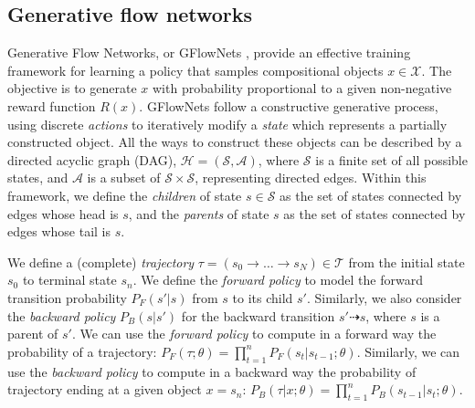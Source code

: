 \documentclass[twoside]{article}
\theoremstyle{plain}
\theoremstyle{definition}
\theoremstyle{remark}
\begin{document}
\subsection{Generative flow networks}
\label{sec:gfn}
Generative Flow Networks, or GFlowNets \citep{bengio2021flow,bengio2023gflownet}, provide an effective training framework for learning a policy that samples compositional objects $x \in \mathcal{X}$. The objective is to generate $x$ with probability proportional to a given non-negative reward function $R(x)$. GFlowNets follow a constructive generative process, using discrete \textit{actions} to iteratively modify a \textit{state} which represents a partially constructed object. All the ways to construct these objects can be described by a directed acyclic graph (DAG), \(\mathcal{H}=(\mathcal{S},\mathcal{A})\), where \(\mathcal{S}\) is a finite set of all possible states, and \(\mathcal{A}\) is a subset of \(\mathcal{S}\times\mathcal{S}\), representing directed edges. Within this framework, we define the \textit{children} of state \(s\in\mathcal{S}\) as the set of states connected by edges whose head is \(s\), and the \textit{parents} of state \(s\) as the set of states connected by edges whose tail is \(s\).

We define a (complete) \textit{trajectory} \(\tau = (s_0 \rightarrow \ldots \rightarrow s_N ) \in \mathcal{T}\) from the initial state \(s_0\) to terminal state \(s_n\). We define the \textit{forward policy} to model the forward transition probability \(P_F(s'|s)\) from \(s\) to its child \(s'\). Similarly, we also consider the \textit{backward policy} \(P_B(s|s')\) for the backward transition \(s' \dashrightarrow s\), where \(s\) is a parent of \(s'\). We can use the \textit{forward policy} to compute in a forward way the probability of a trajectory: $P_F(\tau;\theta) = \prod_{t=1}^n P_F\left(s_t|s_{t-1};\theta\right)$. Similarly, we can use the \textit{backward policy} to compute in a backward way the probability of trajectory ending at a given object $x=s_n$: $P_B(\tau|x;\theta) = \prod_{t=1}^n P_B\left(s_{t-1}|s_t;\theta\right)$.
\end{document}
